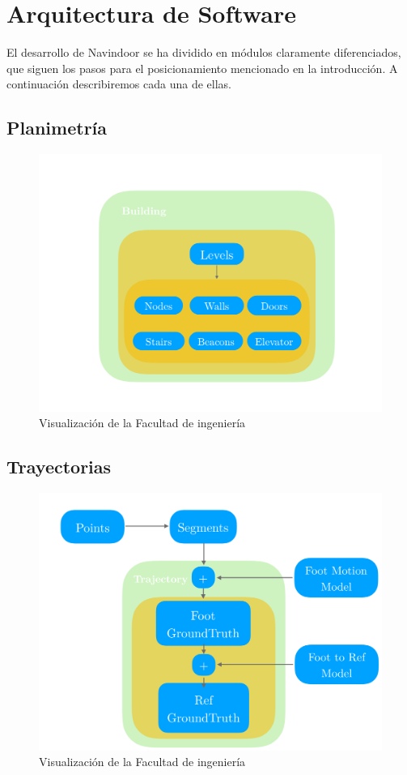 \section{Arquitectura de Software}

El desarrollo de Navindoor se ha dividido en módulos claramente diferenciados, que siguen los pasos para el posicionamiento mencionado en la introducción. A continuación describiremos cada una de ellas.
\subsection{Planimetría}
\begin{figure}
    \includegraphics[width=1.0\columnwidth]{img/Design/1.pdf}
    \caption[]{Visualización de la Facultad de ingeniería}
\end{figure}
\subsection{Trayectorias}
\begin{figure}
    \includegraphics[width=1.0\columnwidth]{img/Design/2.pdf}
    \caption[]{Visualización de la Facultad de ingeniería}
\end{figure}
